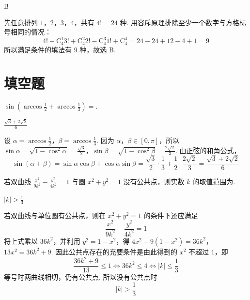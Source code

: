 \begin{answer}
B
\end{answer}

\begin{solution}
先任意排列 \(1\)，\(2\)，\(3\)，\(4\)，共有 \(4!=24\) 种. 用容斥原理排除至少一个数字与方格标号相同的情况：
\[
4!-\mathrm C_4^1 3!+\mathrm C_4^2 2!-\mathrm C_4^3 1!+\mathrm C_4^4
=24-24+12-4+1=9
\]
所以满足条件的填法有 \(9\) 种，故选 B.
\end{solution}

\section{填空题}

\begin{problem}
\(\sin\left(\arccos\frac{1}{2}+\arccos\frac{1}{3}\right)=\)\fillinblank{}.
\end{problem}

\begin{answer}
\(\frac{\sqrt{3}+2\sqrt{2}}{6}\)
\end{answer}

\begin{solution}
设
\(\alpha=\arccos\frac12\)，\(\beta=\arccos\frac13\).
因为 \(\alpha\)，\(\beta\in[0,\pi]\)，所以
\(\sin\alpha=\sqrt{1-\cos^2\alpha}=\frac{\sqrt3}{2}\)，\(\sin\beta=\sqrt{1-\cos^2\beta}=\frac{2\sqrt2}{3}\).
由正弦的和角公式，
\[
\sin(\alpha+\beta)
=\sin\alpha\cos\beta+\cos\alpha\sin\beta
=\frac{\sqrt3}{2}\cdot\frac13+\frac12\cdot\frac{2\sqrt2}{3}
=\frac{\sqrt3+2\sqrt2}{6}
\]
\end{solution}

\begin{problem}
若双曲线 \(\frac{x^2}{9k^2}-\frac{y^2}{4k^2}=1\) 与圆 \(x^2+y^2=1\) 没有公共点，则实数 \(k\) 的取值范围为\fillinblank{}.
\end{problem}

\begin{answer}
\(\left|k\right|>\frac{1}{3}\)
\end{answer}

\begin{solution}
若双曲线与单位圆有公共点，则在 \(x^2+y^2=1\) 的条件下还应满足
\[
\frac{x^2}{9k^2}-\frac{y^2}{4k^2}=1
\]
将上式乘以 \(36k^2\)，并利用 \(y^2=1-x^2\)，得
\(4x^2-9(1-x^2)=36k^2\)，\(13x^2=36k^2+9\).
因此公共点存在的充要条件是由此得到的 \(x^2\) 不超过 \(1\)，即
\[
\frac{36k^2+9}{13}\leq1
\Longleftrightarrow
36k^2\leq4
\Longleftrightarrow
|k|\leq\frac13
\]
等号时两曲线相切，仍有公共点. 所以没有公共点时
\[
|k|>\frac13
\]
\end{solution}

